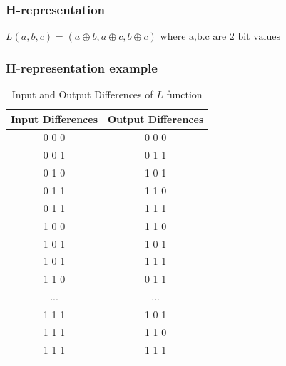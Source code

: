 \documentclass{beamer}
\begin{document}
\begin{frame}
    \frametitle{H-representation}
    
\begin{center}
    $L(a,b,c)=(a \oplus b , a \oplus c , b \oplus c ) \text{ where a,b.c are 2 bit values}  $
\end{center}

\end{frame}

\begin{frame}
    \frametitle{H-representation example}
\begin{table}[h]
\footnotesize
\centering
\begin{tabular}{|c|c|}
\hline
\textbf{Input Differences} & \textbf{Output Differences} \\ \hline
0 0 0 & 0 0 0 \\ \hline
0 0 1 & 0 1 1 \\ \hline
0 1 0 & 1 0 1 \\ \hline
0 1 1 & 1 1 0 \\ \hline
0 1 1 & 1 1 1 \\ \hline
1 0 0 & 1 1 0 \\ \hline
1 0 1 & 1 0 1 \\ \hline
1 0 1 & 1 1 1 \\ \hline
1 1 0 & 0 1 1 \\ \hline
... & ... \\ \hline
1 1 1 & 1 0 1 \\ \hline
1 1 1 & 1 1 0 \\ \hline
1 1 1 & 1 1 1 \\ \hline
\end{tabular}
\caption{Input and Output Differences of $L$ function}
\label{tab:hreptab}
\end{table}
    
\end{frame}
\end{document}
